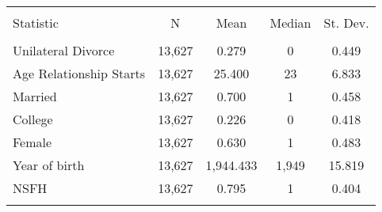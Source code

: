 
\begin{tabular}{@{\extracolsep{5pt}}lcccc} 
\\[-1.8ex]\hline 
\hline \\[-1.8ex] 
Statistic & \multicolumn{1}{c}{N} & \multicolumn{1}{c}{Mean} & \multicolumn{1}{c}{Median} & \multicolumn{1}{c}{St. Dev.} \\ 
\hline \\[-1.8ex] 
Unilateral Divorce & 13,627 & 0.279 & 0 & 0.449 \\ 
Age Relationship Starts & 13,627 & 25.400 & 23 & 6.833 \\ 
Married & 13,627 & 0.700 & 1 & 0.458 \\ 
College & 13,627 & 0.226 & 0 & 0.418 \\ 
Female & 13,627 & 0.630 & 1 & 0.483 \\ 
Year of birth & 13,627 & 1,944.433 & 1,949 & 15.819 \\ 
NSFH & 13,627 & 0.795 & 1 & 0.404 \\ 
\hline \\[-1.8ex] 
\end{tabular} 
